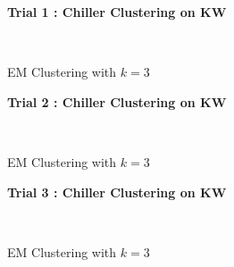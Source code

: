 \begin{figure}[!h]
\centerline{\bfseries\Large Trial 1 : Chiller Clustering on KW}\\
\caption{EM Clustering with $k=3$}
\end{figure}
\begin{figure}[!h]
\centerline{\bfseries\Large Trial 2 : Chiller Clustering on KW}\\
\caption{EM Clustering with $k=3$}
\end{figure}
\begin{figure}[!h]
\centerline{\bfseries\Large Trial 3 : Chiller Clustering on KW}\\
\caption{EM Clustering with $k=3$}
\end{figure}
